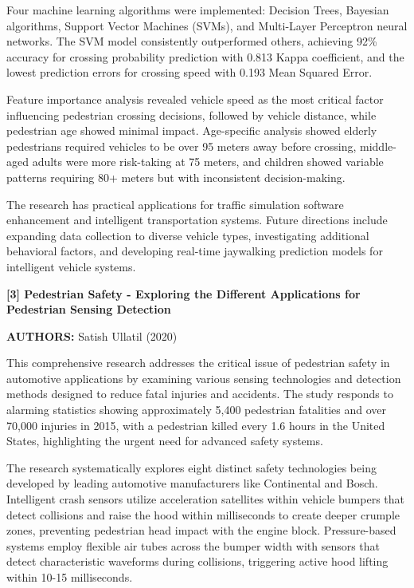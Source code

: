\documentclass[a4paper, 12pt]{report}
\begin{document}
Four machine learning algorithms were implemented: Decision Trees, Bayesian algorithms, Support Vector Machines (SVMs), and Multi-Layer Perceptron neural networks. The SVM model consistently outperformed others, achieving 92\% accuracy for crossing probability prediction with 0.813 Kappa coefficient, and the lowest prediction errors for crossing speed with 0.193 Mean Squared Error.

Feature importance analysis revealed vehicle speed as the most critical factor influencing pedestrian crossing decisions, followed by vehicle distance, while pedestrian age showed minimal impact. Age-specific analysis showed elderly pedestrians required vehicles to be over 95 meters away before crossing, middle-aged adults were more risk-taking at 75 meters, and children showed variable patterns requiring 80+ meters but with inconsistent decision-making.

The research has practical applications for traffic simulation software enhancement and intelligent transportation systems. Future directions include expanding data collection to diverse vehicle types, investigating additional behavioral factors, and developing real-time jaywalking prediction models for intelligent vehicle systems.

\noindent \textbf{[3] Pedestrian Safety - Exploring the Different Applications for Pedestrian Sensing Detection}

\textbf{AUTHORS:} Satish Ullatil (2020)


This comprehensive research addresses the critical issue of pedestrian safety in automotive applications by examining various sensing technologies and detection methods designed to reduce fatal injuries and accidents. The study responds to alarming statistics showing approximately 5,400 pedestrian fatalities and over 70,000 injuries in 2015, with a pedestrian killed every 1.6 hours in the United States, highlighting the urgent need for advanced safety systems.

The research systematically explores eight distinct safety technologies being developed by leading automotive manufacturers like Continental and Bosch. Intelligent crash sensors utilize acceleration satellites within vehicle bumpers that detect collisions and raise the hood within milliseconds to create deeper crumple zones, preventing pedestrian head impact with the engine block. Pressure-based systems employ flexible air tubes across the bumper width with sensors that detect characteristic waveforms during collisions, triggering active hood lifting within 10-15 milliseconds.
\end{document}
